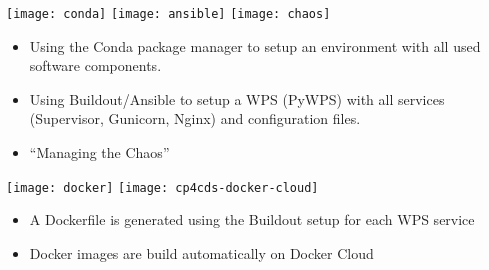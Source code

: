 \documentclass[portrait,a0paper,fontscale=0.4]{baposter} %
\newcommand{\compresslist}{%
\setlength{\itemsep}{1pt}%
\setlength{\parskip}{0pt}%
\setlength{\parsep}{0pt}%
}
\begin{document}
\begin{poster}
{  %

  \begin{minipage}{0.3\textwidth}
    \texttt{[image: conda]}
    \texttt{[image: ansible]}
    \texttt{[image: chaos]}
  \end{minipage}
  \begin{minipage}{0.7\textwidth}
    \begin{itemize}\compresslist
      \item Using the Conda package manager to setup an environment with all used software components.
      \item Using Buildout/Ansible to setup a WPS (PyWPS) with all services (Supervisor, Gunicorn, Nginx)
        and configuration files.
      \item ``Managing the Chaos''
    \end{itemize}
  \end{minipage}
  \vspace{1em}

  \begin{minipage}{0.3\textwidth}
    \texttt{[image: docker]}
    \texttt{[image: cp4cds-docker-cloud]}
  \end{minipage}
  \begin{minipage}{0.7\textwidth}
    \begin{itemize}\compresslist
      \item A Dockerfile is generated using the Buildout setup for each WPS service
      \item Docker images are build automatically on Docker Cloud
    \end{itemize}
  \end{minipage}
  \vspace{1em}

}



\end{poster}
\end{document}
